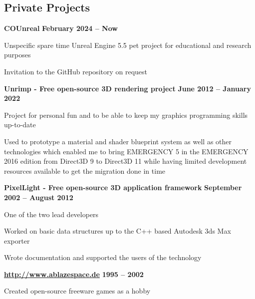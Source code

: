 \documentclass[margin,line]{Ofenberg_Resume}
\begin{document}
\begin{resume}
	\section{\mysidestyle Private \linebreak Projects}
	\textbf{COUnreal} \hfill \textbf{February 2024 -- Now}\vspace{-3mm}\\\vspace{-1mm}%
	\begin{list2}
		\item Unspecific spare time Unreal Engine 5.5 pet project for educational and research purposes
		\item Invitation to the GitHub repository on request
	\end{list2}\vspace{-1.5mm}
	\textbf{Unrimp - Free open-source 3D rendering project} \hfill \textbf{June 2012 -- January 2022}\vspace{-3mm}\\\vspace{-1mm}%
	\begin{list2}
		\item Project for personal fun and to be able to keep my graphics programming skills up-to-date
		\item Used to prototype a material and shader blueprint system as well as other technologies which enabled me to bring EMERGENCY 5 in the EMERGENCY 2016 edition from Direct3D 9 to Direct3D 11 while having limited development resources available to get the migration done in time
	\end{list2}\vspace{-1.5mm}
	\textbf{PixelLight - Free open-source 3D application framework} \hfill \textbf{September 2002 -- August 2012}\vspace{-3mm}\\\vspace{-1mm}%
	\begin{list2}
		\item One of the two lead developers
		\item Worked on basic data structures up to the C++ based Autodesk 3ds Max exporter
		\item Wrote documentation and supported the users of the technology
	\end{list2}\vspace{-1.5mm}
	\textbf{\url{http://www.ablazespace.de}} \hfill \textbf{1995 -- 2002}\vspace{-3mm}\\\vspace{-1mm}%
	\begin{list2}
		\item Created open-source freeware games as a hobby
	\end{list2}\vspace{-1.5mm}



\end{resume}
\end{document}
